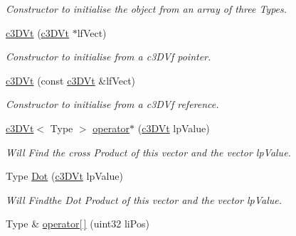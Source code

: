 \begin{DoxyCompactItemize}
\begin{DoxyCompactList}\small\item\em Constructor to initialise the object from an array of three Types. \end{DoxyCompactList}\item 
\hypertarget{classc3_d_vt_a23c294617b443c3b822123f743f81b42}{
\hyperlink{classc3_d_vt_a23c294617b443c3b822123f743f81b42}{c3DVt} (\hyperlink{classc3_d_vt}{c3DVt} $\ast$lfVect)}
\label{classc3_d_vt_a23c294617b443c3b822123f743f81b42}

\begin{DoxyCompactList}\small\item\em Constructor to initialise from a c3DVf pointer. \end{DoxyCompactList}\item 
\hypertarget{classc3_d_vt_ab7c2382886c4cf854b848ebfaa91efe4}{
\hyperlink{classc3_d_vt_ab7c2382886c4cf854b848ebfaa91efe4}{c3DVt} (const \hyperlink{classc3_d_vt}{c3DVt} \&lfVect)}
\label{classc3_d_vt_ab7c2382886c4cf854b848ebfaa91efe4}

\begin{DoxyCompactList}\small\item\em Constructor to initialise from a c3DVf reference. \end{DoxyCompactList}\item 
\hypertarget{classc3_d_vt_aa4d37192fbdce9242ce40a0e79ff99c3}{
\hyperlink{classc3_d_vt}{c3DVt}$<$ Type $>$ \hyperlink{classc3_d_vt_aa4d37192fbdce9242ce40a0e79ff99c3}{operator$\ast$} (\hyperlink{classc3_d_vt}{c3DVt} lpValue)}
\label{classc3_d_vt_aa4d37192fbdce9242ce40a0e79ff99c3}

\begin{DoxyCompactList}\small\item\em Will Find the cross Product of this vector and the vector lpValue. \end{DoxyCompactList}\item 
\hypertarget{classc3_d_vt_a8868266d3e9f7f711e2afea9982e192c}{
Type \hyperlink{classc3_d_vt_a8868266d3e9f7f711e2afea9982e192c}{Dot} (\hyperlink{classc3_d_vt}{c3DVt} lpValue)}
\label{classc3_d_vt_a8868266d3e9f7f711e2afea9982e192c}

\begin{DoxyCompactList}\small\item\em Will Findthe Dot Product of this vector and the vector lpValue. \end{DoxyCompactList}\item 
\hypertarget{classc3_d_vt_a58fc8999e5128aaa4f9cadab9ddae1f7}{
Type \& \hyperlink{classc3_d_vt_a58fc8999e5128aaa4f9cadab9ddae1f7}{operator\mbox{[}$\,$\mbox{]}} (uint32 liPos)}
\label{classc3_d_vt_a58fc8999e5128aaa4f9cadab9ddae1f7}


\end{DoxyCompactItemize}
